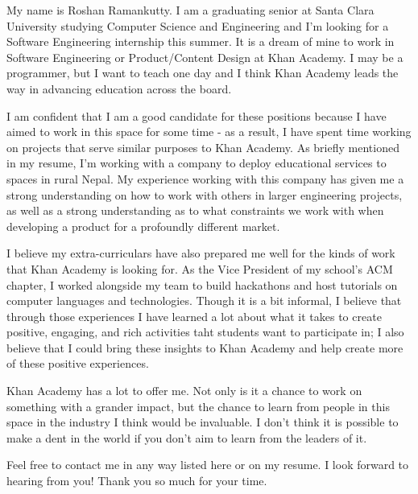 \documentclass[10pt,a4paper,sans]{moderncv}        %
\begin{document}
My name is Roshan Ramankutty. I am a graduating senior at Santa Clara University studying Computer Science and Engineering and I'm looking for a Software Engineering internship this summer. It is a dream of mine to work in Software Engineering or Product/Content Design at Khan Academy. I may be a programmer, but I want to teach one day and I think Khan Academy leads the way in advancing education across the board. 

I am confident that I am a good candidate for these positions because I have aimed to work in this space for some time - as a result, I have spent time working on projects that serve similar purposes to Khan Academy. As briefly mentioned in my resume, I'm working with a company to deploy educational services to spaces in rural Nepal. My experience working with this company has given me a strong understanding on how to work with others in larger engineering projects, as well as a strong understanding as to what constraints we work with when developing a product for a profoundly different market.

I believe my extra-curriculars have also prepared me well for the kinds of work that Khan Academy is looking for. As the Vice President of my school's ACM chapter, I worked alongside my team to build hackathons and host tutorials on computer languages and technologies. Though it is a bit informal, I believe that through those experiences I have learned a lot about what it takes to create positive, engaging, and rich activities taht students want to participate in; I also believe that I could bring these insights to Khan Academy and help create more of these positive experiences.

Khan Academy has a lot to offer me. Not only is it a chance to work on something with a grander impact, but the chance to learn from people in this space in the industry I think would be invaluable. I don't think it is possible to make a dent in the world if you don't aim to learn from the leaders of it. 

Feel free to contact me in any way listed here or on my resume. I look forward to hearing from you! Thank you so much for your time.

\makeletterclosing

\end{document}

